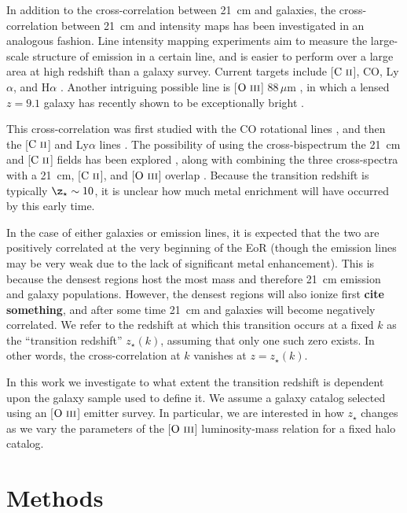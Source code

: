 \documentclass[a4paper,fleqn,usenatbib]{mnras}
\newcommand{\CII}{\ensuremath{\text{C~\textsc{ii}}}}
\newcommand{\OIII}{\ensuremath{\text{O~\textsc{iii}}}}
\begin{document}
In addition to the cross-correlation between 21~cm and galaxies, the
cross-correlation between 21~cm and intensity maps has been investigated in an
analogous fashion. Line intensity mapping experiments aim to measure the
large-scale structure of emission in a certain line, and is easier to perform
over a large area at high redshift than a galaxy survey. Current targets
include [\CII], CO, Ly$\alpha$, and H$\alpha$ \citep[for a recent review,
see][]{2017arXiv170909066K}. Another intriguing possible line is [\OIII]
$88\,\mu \text{m}$ \citep[e.g.][]{2018MNRAS.481L..84M}, in which a lensed
$z=9.1$ galaxy has recently shown to be exceptionally bright
\citep{2018Natur.557..392H}.

This cross-correlation was first studied with the CO rotational lines
\citep{2011ApJ...741...70L}, and then the [\CII] \citep{2012ApJ...745...49G}
and Ly$\alpha$ lines \citep{2013ApJ...763..132S}. The possibility of using the
cross-bispectrum the 21~cm and [\CII] fields has been explored
\citep{2018ApJ...867...26B}, along with combining the three cross-spectra with
a 21~cm, [\CII], and [\OIII] overlap \citep{2019ApJ...874..133B}. Because the
transition redshift is typically $\z_{\star} \sim 10$, it is unclear how much
metal enrichment will have occurred by this early time. 

In the case of either galaxies or emission lines, it is expected that the two
are positively correlated at the very beginning of the EoR (though the
emission lines may be very weak due to the lack of significant metal
enhancement). This is because the densest regions host the most mass and
therefore 21~cm emission and galaxy populations. However, the densest regions
will also ionize first {\bf cite something}, and after some time 21~cm and
galaxies will become negatively correlated. We refer to the redshift at which
this transition occurs at a fixed $k$ as the ``transition redshift''
$z_\star(k)$, assuming that only one such zero exists. In other words, the
cross-correlation at $k$ vanishes at $z=z_{\star}(k)$.

In this work we investigate to what extent the transition redshift is
dependent upon the galaxy sample used to define it. We assume a galaxy catalog
selected using an [\OIII] emitter survey. In particular, we are interested in
how $z_\star$ changes as we vary the parameters of the [\OIII] luminosity-mass
relation for a fixed halo catalog.

\section{Methods} \label{sec:methods}
\end{document}
